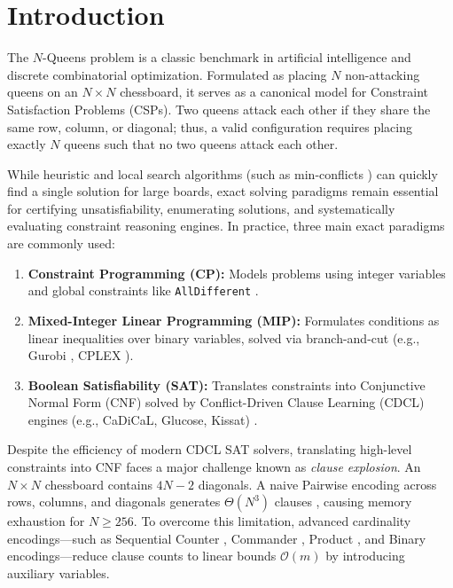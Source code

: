 \documentclass[a4paper,fleqn]{cas-sc}
\begin{document}
\maketitle

\section{Introduction}
\label{sec:intro}

The $N$-Queens problem is a classic benchmark in artificial intelligence and discrete combinatorial optimization. Formulated as placing $N$ non-attacking queens on an $N \times N$ chessboard, it serves as a canonical model for Constraint Satisfaction Problems (CSPs). Two queens attack each other if they share the same row, column, or diagonal; thus, a valid configuration requires placing exactly $N$ queens such that no two queens attack each other.

While heuristic and local search algorithms (such as min-conflicts \cite{minton1992solving}) can quickly find a single solution for large boards, exact solving paradigms remain essential for certifying unsatisfiability, enumerating solutions, and systematically evaluating constraint reasoning engines. In practice, three main exact paradigms are commonly used:
\begin{enumerate}
    \item \textbf{Constraint Programming (CP):} Models problems using integer variables and global constraints like \texttt{AllDifferent} \cite{ibm2022cplex,regin1994filtering}.
    \item \textbf{Mixed-Integer Linear Programming (MIP):} Formulates conditions as linear inequalities over binary variables, solved via branch-and-cut (e.g., Gurobi \cite{gurobi2025}, CPLEX \cite{ibm2022cplex}).
    \item \textbf{Boolean Satisfiability (SAT):} Translates constraints into Conjunctive Normal Form (CNF) solved by Conflict-Driven Clause Learning (CDCL) engines (e.g., CaDiCaL, Glucose, Kissat) \cite{biere2021handbook}.
\end{enumerate}

Despite the efficiency of modern CDCL SAT solvers, translating high-level constraints into CNF faces a major challenge known as \textit{clause explosion}. An $N \times N$ chessboard contains $4N - 2$ diagonals. A naive Pairwise encoding across rows, columns, and diagonals generates $\Theta(N^3)$ clauses \cite{prestwich2009cnf}, causing memory exhaustion for $N \ge 256$. To overcome this limitation, advanced cardinality encodings—such as Sequential Counter \cite{sinz2005towards}, Commander \cite{klieber2007commander}, Product \cite{chen2010new}, and Binary \cite{frisch2005symmetry} encodings—reduce clause counts to linear bounds $\mathcal{O}(m)$ by introducing auxiliary variables.
\end{document}
